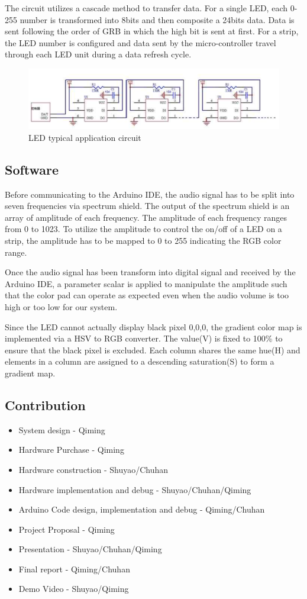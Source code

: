 \documentclass[12pt,a4paper,journal]{IEEEtran}
\begin{document}
The circuit utilizes a cascade method to transfer data. For a single LED, each 0-255 number is transformed into 8bits and then composite a 24bits data. Data is sent following the order of GRB in which the high bit is sent at first. For a strip, the LED number is configured and data sent by the micro-controller travel through each LED unit during a data refresh cycle.
\begin{figure}
  \centering
  \includegraphics[width=0.7\linewidth]{ledcircuit.png}
  \caption{LED typical application circuit}
  \label{fig:ledtac}
\end{figure}
\subsection{Software}
Before communicating to the Arduino IDE, the audio signal has to be split into seven frequencies via spectrum shield. The output of the spectrum shield is an array of amplitude of each frequency. The amplitude of each frequency ranges from 0 to 1023. To utilize the amplitude to control the on/off of a LED on a strip, the amplitude has to be mapped to 0 to 255 indicating the RGB color range.

Once the audio signal has been transform into digital signal and received by the Arduino IDE, a parameter scalar is applied to manipulate the amplitude such that the color pad can operate as expected even when the audio volume is too high or too low for our system.

Since the LED cannot actually display black pixel {0,0,0}, the gradient color map is implemented via a HSV to RGB converter. The value(V) is fixed to 100\% to ensure that the black pixel is excluded. Each column shares the same hue(H) and elements in a column are assigned to a descending saturation(S) to form a gradient map.
\subsection{Contribution}
\begin{itemize}
\item System design - Qiming
\item Hardware Purchase - Qiming
\item Hardware construction - Shuyao/Chuhan
\item Hardware implementation and debug - Shuyao/Chuhan/Qiming
\item Arduino Code design, implementation and debug - Qiming/Chuhan
\item Project Proposal - Qiming
\item Presentation - Shuyao/Chuhan/Qiming
\item Final report - Qiming/Chuhan
\item Demo Video - Shuyao/Qiming
\end{itemize}
\end{document}
